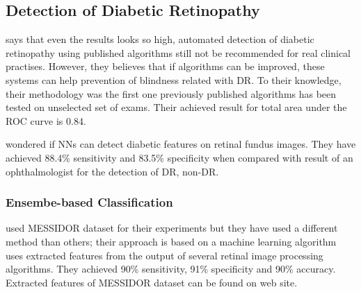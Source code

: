 \subsection{Detection of Diabetic Retinopathy}

\citet{abramoff2008evaluation} says that even the results looks so high, automated detection of diabetic retinopathy using published algorithms still not be recommended for real clinical practises. However, they believes that if algorithms can be improved, these systems can help prevention of blindness related with DR. To their knowledge, their methodology was the first one previously published algorithms has been tested on unselected set of exams. Their achieved result for total area under the ROC curve is 0.84.

\citet{gardner1996automatic} wondered if NNs can detect diabetic features on retinal fundus images. They have achieved 88.4\% sensitivity and 83.5\% specificity when compared with result of an ophthalmologist for the detection of DR, non-DR. 

\subsubsection{Ensembe-based Classification}

\citet{antal2014ensemble} used MESSIDOR dataset for their experiments but they have used a different method than others; their approach is based on a machine learning algorithm uses extracted features from the output of several retinal image processing algorithms. They achieved 90\% sensitivity, 91\% specificity and 90\% accuracy. Extracted features of MESSIDOR dataset can be found on \citet{EnsembleBased} web site. 